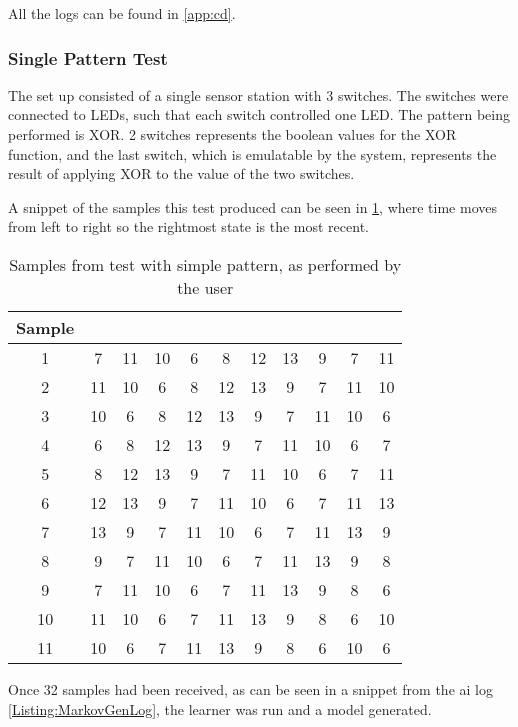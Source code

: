 All the logs can be found in \cref{app:cd}.
\subsubsection{Single Pattern Test}\label{subsec:singlePatternTest}
The set up consisted of a single sensor station with 3 switches. The switches were connected to LEDs, such that each switch controlled one LED. The pattern being performed is XOR. 2 switches represents the boolean values for the XOR function, and the last switch, which is emulatable by the system, represents the result of applying XOR to the value of the two switches.

A snippet of the samples this test produced can be seen in \cref{Table:SampleSnippet}, where time moves from left to right so the rightmost state is the most recent.
\begin{center}

\begin{table}[htbp]
  \centering
  \begin{tabular}{c c c c c c c c c c c}
    \toprule
    Sample & & & & & & & & & &  \\ \midrule
           1 & 7 & 11 & 10 & 6 & 8 & 12 & 13 & 9 & 7 & 11 \\
           2 & 11 & 10 & 6 & 8 & 12 & 13 & 9 & 7 & 11 & 10 \\
           3 & 10 & 6 & 8 & 12 & 13 & 9 & 7 & 11 & 10 & 6 \\
           4 & 6  & 8 & 12 & 13 & 9 & 7 & 11 & 10 & 6 & 7 \\
           5 & 8 & 12 & 13 & 9 & 7 & 11 & 10 & 6 & 7 & 11 \\
           6 & 12 & 13 & 9 & 7 & 11 & 10 & 6 & 7 & 11 & 13 \\
           7 & 13 & 9 & 7 & 11 & 10 & 6 & 7 & 11 & 13 & 9 \\
           8 & 9 & 7 & 11 & 10 & 6 & 7 & 11 & 13 & 9 & 8 \\
           9 & 7 & 11 & 10 & 6 & 7 & 11 & 13 & 9 & 8 & 6 \\
           10& 11 & 10 & 6 & 7 & 11 & 13 & 9 & 8 & 6 & 10 \\
           11 & 10 & 6 & 7 & 11 & 13 & 9 & 8 & 6 & 10 & 6
     \\ \bottomrule
  \end{tabular}
  \caption{Samples from test with simple pattern, as performed by the user}\label{Table:SampleSnippet}
\end{table}
\end{center}
Once 32 samples had been received, as can be seen in a snippet from the ai log \cref{Listing:MarkovGenLog}, the learner was run and a model generated.

